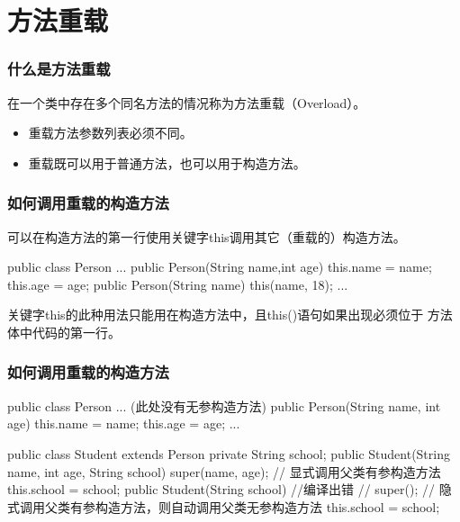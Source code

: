\section{方法重载}
\begin{frame}[fragile] %
\frametitle{什么是方法重载}

在一个类中存在多个同名方法的情况称为{\hei 方法重载（Overload）}。

\begin{itemize}\kai
\item 重载方法参数列表必须不同。
\item 重载既可以用于普通方法，也可以用于构造方法。
\end{itemize}

\end{frame}

\begin{frame}[fragile] %
  \frametitle{如何调用重载的构造方法}
  

  可以在构造方法的第一行使用关键字this调用其它（重载的）构造方法。

  \begin{javaCode}
    public class Person {
      ...
      public Person(String name,int age) {
        this.name = name;
        this.age = age;
      }
      public Person(String name) {
        this(name, 18);
      }
      ...
    }
  \end{javaCode}

  
  关键字this的此种用法只能用在构造方法中，且this()语句如果出现必须位于
  方法体中代码的第一行。
\end{frame}

\begin{frame}[fragile] %
  \frametitle{如何调用重载的构造方法}


  \begin{javaCode}
    public class Person {
      ... (此处没有无参构造方法)
      public Person(String name, int age) {
        this.name = name;
        this.age = age;
      }
      ...
    }  
  \end{javaCode}
  
  
  \begin{javaCode}
    public class Student extends Person {
      private String school;
      public Student(String name, int age, String school) {
        super(name, age); // 显式调用父类有参构造方法
        this.school = school;
      }
      public Student(String school) { //编译出错
        // super(); // 隐式调用父类有参构造方法，则自动调用父类无参构造方法
        this.school = school;
      }
    }
\end{javaCode}
\end{frame}


